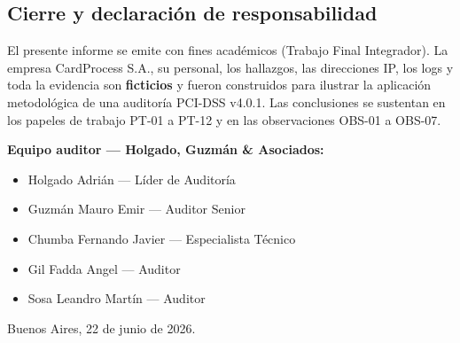 \documentclass[11pt,a4paper]{article}
\begin{document}
\subsection{Cierre y declaración de responsabilidad}

El presente informe se emite con fines académicos (Trabajo Final Integrador). La empresa CardProcess S.A., su personal, los hallazgos, las direcciones IP, los logs y toda la evidencia son \textbf{ficticios} y fueron construidos para ilustrar la aplicación metodológica de una auditoría PCI-DSS v4.0.1. Las conclusiones se sustentan en los papeles de trabajo PT-01 a PT-12 y en las observaciones OBS-01 a OBS-07.

\textbf{Equipo auditor — Holgado, Guzmán \& Asociados:}

\begin{itemize}[leftmargin=*]
  \item Holgado Adrián — Líder de Auditoría
  \item Guzmán Mauro Emir — Auditor Senior
  \item Chumba Fernando Javier — Especialista Técnico
  \item Gil Fadda Angel — Auditor
  \item Sosa Leandro Martín — Auditor
\end{itemize}

Buenos Aires, 22 de junio de 2026.
\end{document}
